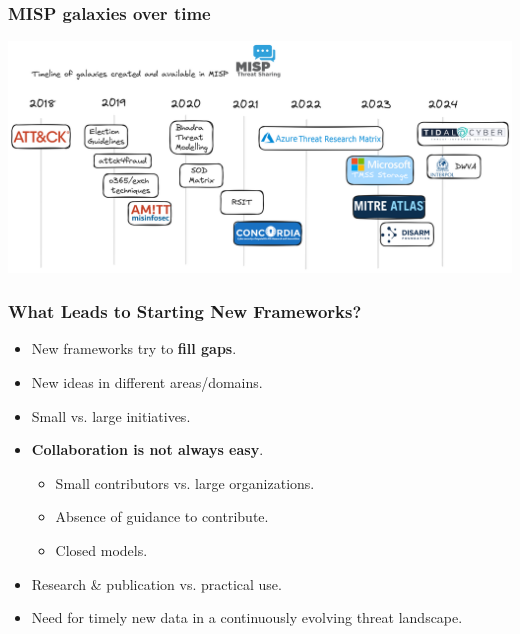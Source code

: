 \begin{frame}
	\frametitle{MISP galaxies over time}
	\begin{center}
	\includegraphics[scale=0.13]{./screenshots/timeline.png}
	\end{center}
\end{frame}

\begin{frame}
        \frametitle{What Leads to Starting New Frameworks?}
        \begin{itemize}
	\item New frameworks try to {\bf fill gaps}.
            \item New ideas in different areas/domains.
            \item Small vs. large initiatives.
	    \item {\bf Collaboration is not always easy}.
                \begin{itemize}
                    \item Small contributors vs. large organizations.
                    \item Absence of guidance to contribute.
                    \item Closed models.
                \end{itemize}
            \item Research \& publication vs. practical use.
            \item Need for timely new data in a continuously evolving threat landscape.
        \end{itemize}
\end{frame}


